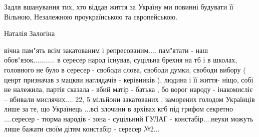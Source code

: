 Задля вшанування тих, хто віддав життя за Україну ми повинні будувати її
Вільною, Незалежною проукраїнською та європейською.

Наталія Залогіна

вічна пам"ять всім закатованим і репресованим....
пам"ятати - наш обов"язок........... в сересер народ існував, суцільна брехня на тб і в школах, головного не було в сересер - свободи слова, свободи думки, свободи вибору ( ценрт призначав з мацкви наглядачів - керівників ), людина і її життя- ніщо, собі не належила, партія сказала - вбий матір - батька , бо ворог народу - інакомисліє -- вбивали мислячих.... 22, 5 мільйони закатованих , заморених голодом Українців лише за те, що Українець ...всі злочини в архівах кгб під грифом секретно ....сересер - тюрма народів - зона - суцільний ГУЛАГ - констабір....неуки можуть лише бажати своїм дітям констабір - сересер №2...
